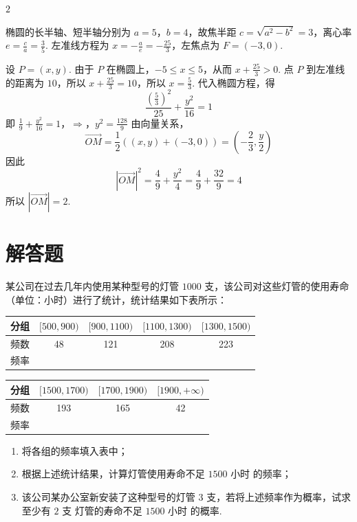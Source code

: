 \begin{answer}
\(2\)
\end{answer}

\begin{solution}
椭圆的长半轴、短半轴分别为 \(a=5\)，\(b=4\)，故焦半距 \(c=\sqrt{a^2-b^2}=3\)，离心率 \(e=\frac{c}{a}=\frac{3}{5}\). 左准线方程为 \(x=-\frac{a}{e}=-\frac{25}{3}\)，左焦点为 \(F=(-3,0)\).

设 \(P=(x,y)\). 由于 \(P\) 在椭圆上，\(-5\leqslant x\leqslant5\)，从而 \(x+\frac{25}{3}>0\). 点 \(P\) 到左准线的距离为 \(10\)，所以
\(x+\frac{25}{3}=10\)，所以 \(x=\frac{5}{3}\).
代入椭圆方程，得
\[
\frac{(\frac{5}{3})^2}{25}+\frac{y^2}{16}=1
\]
即
\(\frac{1}{9}+\frac{y^2}{16}=1\)，\(\Longrightarrow\)，\(y^2=\frac{128}{9}\)
由向量关系，
\[
\overrightarrow{OM}=\frac{1}{2}\left((x,y)+(-3,0)\right)
=\left(-\frac{2}{3},\frac{y}{2}\right)
\]
因此
\[
\left|\overrightarrow{OM}\right|^2=\frac{4}{9}+\frac{y^2}{4}=\frac{4}{9}+\frac{32}{9}=4
\]
所以 \(\left|\overrightarrow{OM}\right|=2\).
\end{solution}

\section{解答题}

\begin{problem}
某公司在过去几年内使用某种型号的灯管 \(1000\text{ 支}\)，该公司对这些灯管的使用寿命（单位：小时）进行了统计，统计结果如下表所示：

\begin{center}\small
\begin{tabular}{|c|c|c|c|c|}
\hline
分组 & \([500,900)\) & \([900,1100)\) & \([1100,1300)\) & \([1300,1500)\) \\
\hline
频数 & 48 & 121 & 208 & 223 \\
\hline
频率 &  &  &  &  \\
\hline
\end{tabular}

\vspace{0.5em}

\begin{tabular}{|c|c|c|c|}
\hline
分组 & \([1500,1700)\) & \([1700,1900)\) & \([1900,+\infty)\) \\
\hline
频数 & 193 & 165 & 42 \\
\hline
频率 &  &  &  \\
\hline
\end{tabular}
\end{center}

\begin{enumerate}
\item 将各组的频率填入表中；
\item 根据上述统计结果，计算灯管使用寿命不足 \(1500\text{ 小时}\) 的频率；
\item 该公司某办公室新安装了这种型号的灯管 \(3\text{ 支}\)，若将上述频率作为概率，试求至少有 \(2\text{ 支}\) 灯管的寿命不足 \(1500\text{ 小时}\) 的概率.
\end{enumerate}
\end{problem}

